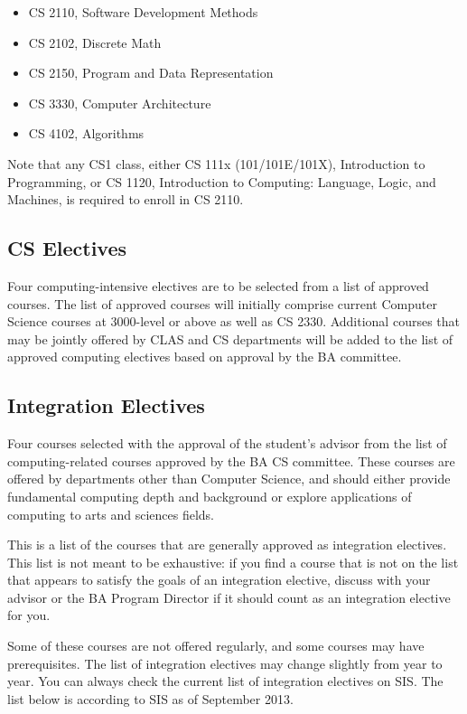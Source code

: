 \documentclass[10pt,letter]{book}
\newenvironment{itemlist}{
\begin{itemize}
\setlength{\itemsep}{0pt}
\setlength{\parskip}{0pt}}
{\end{itemize}}
\begin{document}
\begin{itemlist}
\item CS 2110, Software Development Methods
\item CS 2102, Discrete Math
\item CS 2150, Program and Data Representation
\item CS 3330, Computer Architecture
\item CS 4102, Algorithms
\end{itemlist}

Note that any CS1 class, either CS 111x (101/101E/101X), Introduction
to Programming, or CS 1120, Introduction to Computing: Language,
Logic, and Machines, is required to enroll in CS 2110.

\subsection{CS Electives}

Four computing-intensive electives are to be selected from a list of
approved courses. The list of approved courses will initially comprise
current Computer Science courses at 3000-level or above as well as CS
2330. Additional courses that may be jointly offered by CLAS and CS
departments will be added to the list of approved computing electives
based on approval by the BA committee.


\subsection{Integration Electives}

Four courses selected with the approval of the student's advisor from
the list of computing-related courses approved by the BA CS
committee. These courses are offered by departments other than
Computer Science, and should either provide fundamental computing
depth and background or explore applications of computing to arts and
sciences fields. 

This is a list of the courses that are generally approved as
integration electives. This list is not meant to be exhaustive: if you
find a course that is not on the list that appears to satisfy the
goals of an integration elective, discuss with your advisor or the BA
Program Director if it should count as an integration elective for
you.

Some of these courses are not offered regularly, and some courses may
have prerequisites. The list of integration electives may change
slightly from year to year.  You can always check the current list of
integration electives on SIS.  The list below is according to SIS as
of September 2013.
\end{document}
